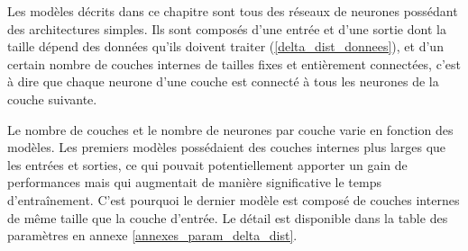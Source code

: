 \par Les modèles décrits dans ce chapitre sont tous des réseaux de neurones possédant des architectures simples. Ils sont composés d'une entrée et d'une sortie dont la taille dépend des données qu'ils doivent traiter (\ref{delta_dist_donnees}), et d'un certain nombre de couches internes de tailles fixes et entièrement connectées, c'est à dire que chaque neurone d'une couche est connecté à tous les neurones de la couche suivante.

\par Le nombre de couches et le nombre de neurones par couche varie en fonction des modèles. Les premiers modèles possédaient des couches internes plus larges que les entrées et sorties, ce qui pouvait potentiellement apporter un gain de performances mais qui augmentait de manière significative le temps d'entraînement. C'est pourquoi le dernier modèle est composé de couches internes de même taille que la couche d'entrée. Le détail est disponible dans la table des paramètres en annexe \ref{annexes_param_delta_dist}.
